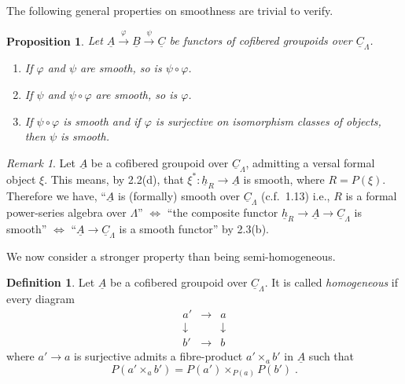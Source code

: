 \documentclass[11pt]{article}
\theoremstyle{plain}
\newtheorem{proposition}[theorem]{Proposition}
\theoremstyle{definition}
\newtheorem{definition}[theorem]{Definition}
\theoremstyle{remark}
\newtheorem{remark}[theorem]{Remark}
\newcommand{\uA}{\underline{A}}\newcommand{\uH}{\underline{H}}\newcommand{\uExt}{\underline{\operatorname{Ext}}}\newcommand{\uL}{\underline{L}}\newcommand{\uM}{\underline{M}}\newcommand{\uZ}{\underline{Z}}\newcommand{\uB}{\underline{B}}\newcommand{\uC}{\underline{C}}\newcommand{\uD}{\underline{D}}\newcommand{\uE}{\underline{E}}\newcommand{\uG}{\underline{G}}\newcommand{\uP}{\underline{P}}\newcommand{\uQ}{\underline{Q}}
\begin{document}
The following general properties on smoothness are trivial to verify.

\begin{proposition}
Let $\uA \xrightarrow{\varphi} \uB \xrightarrow{\psi} \uC$ be functors of cofibered groupoids over $\underline{C}_{\Lambda}$.
\begin{enumerate}
\item[(a)] If $\varphi$ and $\psi$ are smooth, so is $\psi \circ \varphi$.
\item[(b)] If $\psi$ and $\psi \circ \varphi$ are smooth, so is $\varphi$.
\item[(c)] If $\psi \circ \varphi$ is smooth and if $\varphi$ is surjective on isomorphism classes of objects, then $\psi$ is smooth.
\end{enumerate}
\end{proposition}

\begin{remark}
Let $\uA$ be a cofibered groupoid over $\underline{C}_{\Lambda}$, admitting a versal formal object $\xi$. This means, by 2.2(d), that $\xi^* : \underline{h}_R \to \uA$ is smooth, where $R = P(\xi)$. Therefore we have, ``$\uA$ is (formally) smooth over $\underline{C}_{\Lambda}$ (c.f.\ 1.13) i.e., $R$ is a formal power-series algebra over $\Lambda$'' $\Leftrightarrow$ ``the composite functor $\underline{h}_R \to \uA \to \underline{C}_{\Lambda}$ is smooth'' $\Leftrightarrow$ ``$\uA \to \underline{C}_{\Lambda}$ is a smooth functor'' by 2.3(b).
\end{remark}

We now consider a stronger property than being semi-homogeneous.

\begin{definition}
Let $\uA$ be a cofibered groupoid over $\underline{C}_{\Lambda}$. It is called \emph{homogeneous} if every diagram
\[
\begin{array}{ccc}
a' & \longrightarrow & a \\
\downarrow & & \downarrow \\
b' & \longrightarrow & b
\end{array}
\]
where $a' \to a$ is surjective admits a fibre-product $a' \times_a b'$ in $\uA$ such that
\[
P(a' \times_a b') = P(a') \times_{P(a)} P(b')\;.
\]
\end{definition}
\end{document}
